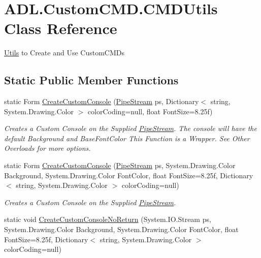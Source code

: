 \hypertarget{class_a_d_l_1_1_custom_c_m_d_1_1_c_m_d_utils}{}\section{A\+D\+L.\+Custom\+C\+M\+D.\+C\+M\+D\+Utils Class Reference}
\label{class_a_d_l_1_1_custom_c_m_d_1_1_c_m_d_utils}


\mbox{\hyperlink{class_a_d_l_1_1_utils}{Utils}} to Create and Use Custom\+C\+M\+Ds  


\subsection*{Static Public Member Functions}
\begin{DoxyCompactItemize}
\item 
static Form \mbox{\hyperlink{class_a_d_l_1_1_custom_c_m_d_1_1_c_m_d_utils_aef482d360188b9439a20d62f170d7718}{Create\+Custom\+Console}} (\mbox{\hyperlink{class_a_d_l_1_1_pipe_stream}{Pipe\+Stream}} ps, Dictionary$<$ string, System.\+Drawing.\+Color $>$ color\+Coding=null, float Font\+Size=8.\+25f)
\begin{DoxyCompactList}\small\item\em Creates a Custom Console on the Supplied \mbox{\hyperlink{class_a_d_l_1_1_pipe_stream}{Pipe\+Stream}}. The console will have the default Background and Base\+Font\+Color This Function is a Wrapper. See Other Overloads for more options. \end{DoxyCompactList}\item 
static Form \mbox{\hyperlink{class_a_d_l_1_1_custom_c_m_d_1_1_c_m_d_utils_ad2f353a5936cfefbece698ad2c7c315b}{Create\+Custom\+Console}} (\mbox{\hyperlink{class_a_d_l_1_1_pipe_stream}{Pipe\+Stream}} ps, System.\+Drawing.\+Color Background, System.\+Drawing.\+Color Font\+Color, float Font\+Size=8.\+25f, Dictionary$<$ string, System.\+Drawing.\+Color $>$ color\+Coding=null)
\begin{DoxyCompactList}\small\item\em Creates a Custom Console on the Supplied \mbox{\hyperlink{class_a_d_l_1_1_pipe_stream}{Pipe\+Stream}}. \end{DoxyCompactList}\item 
static void \mbox{\hyperlink{class_a_d_l_1_1_custom_c_m_d_1_1_c_m_d_utils_ad1ced26069f98da85bfa1e5dd451e539}{Create\+Custom\+Console\+No\+Return}} (System.\+I\+O.\+Stream ps, System.\+Drawing.\+Color Background, System.\+Drawing.\+Color Font\+Color, float Font\+Size=8.\+25f, Dictionary$<$ string, System.\+Drawing.\+Color $>$ color\+Coding=null)

\end{DoxyCompactItemize}
